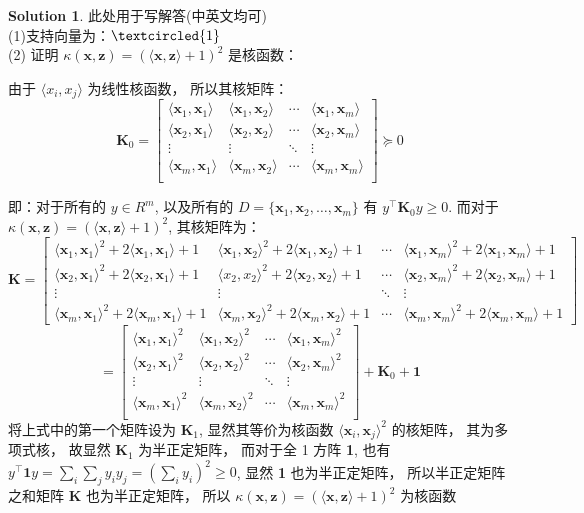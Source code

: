 \documentclass[a4paper,UTF8]{article}
\numberwithin{equation}{section}
\theoremstyle{definition}
\newtheorem*{solution}{Solution}
\def \K {\mathbf{K}}
\def \x {\boldsymbol{x}}
\def \z {\mathbf{z}}
\begin{document}
\begin{solution}
此处用于写解答(中英文均可)
~\\
(1)支持向量为：$\textcircled{1}$\\
(2) 
证明 $\kappa(\x, \z) = (\langle \x, \z \rangle + 1)^2$ 是核函数：

由于 $\langle x_i, x_j \rangle$ 为线性核函数， 所以其核矩阵：
$$\K_0 =
\begin{bmatrix}

\langle \x_1, \x_1 \rangle  & \langle \x_1, \x_2 \rangle & \cdots & \langle \x_1, \x_m \rangle \\
\langle \x_2, \x_1 \rangle & \langle \x_2, \x_2 \rangle & \cdots & \langle \x_2, \x_m \rangle \\
\vdots & \vdots & \ddots & \vdots \\
\langle \x_m, \x_1 \rangle & \langle \x_m, \x_2 \rangle & \cdots & \langle \x_m, \x_m \rangle \\
\end{bmatrix}
\succeq 0 $$


即：对于所有的 $y \in R^m$, 以及所有的 $ D = \{\x_1, \x_2, \ldots, \x_m\}$ 有 $y^\top \K_0 y \geq 0$. 而对于 $\kappa(\x, \z) =(\langle \x, \z \rangle + 1)^2$, 其核矩阵为：
$$\K =
\begin{bmatrix}
\langle \x_1, \x_1 \rangle^2 + 2\langle \x_1, \x_1 \rangle + 1 & \langle \x_1, \x_2 \rangle^2 + 2\langle \x_1, \x_2 \rangle + 1 & \cdots & \langle \x_1, \x_m \rangle^2 + 2\langle \x_1, \x_m \rangle + 1 \\
\langle \x_2, \x_1 \rangle^2 + 2\langle \x_2, \x_1 \rangle + 1 & \langle x_2, x_2 \rangle^2 + 2\langle \x_2, \x_2 \rangle + 1 & \cdots & \langle \x_2, \x_m \rangle^2 + 2\langle \x_2, \x_m \rangle + 1 \\
\vdots & \vdots & \ddots & \vdots \\
\langle \x_m, \x_1 \rangle^2 + 2\langle \x_m, \x_1 \rangle + 1 & \langle \x_m, \x_2 \rangle^2 + 2\langle \x_m, \x_2 \rangle + 1 & \cdots & \langle \x_m, \x_m \rangle^2 + 2\langle \x_m, \x_m \rangle + 1
\end{bmatrix}$$
$$= 
\begin{bmatrix}

\langle \x_1, \x_1 \rangle^2  & \langle \x_1, \x_2 \rangle^2 & \cdots & \langle \x_1, \x_m \rangle^2 \\
\langle \x_2, \x_1 \rangle^2 & \langle \x_2, \x_2 \rangle^2 & \cdots & \langle \x_2, \x_m \rangle^2 \\
\vdots & \vdots & \ddots & \vdots \\
\langle \x_m, \x_1 \rangle^2 & \langle \x_m, \x_2 \rangle^2 & \cdots & \langle \x_m, \x_m \rangle^2 \\
\end{bmatrix}
+\K_0 + \textbf{1}
$$
将上式中的第一个矩阵设为 $\K_1$, 显然其等价为核函数 $\langle \x_i, \x_j \rangle^2$ 的核矩阵， 其为多项式核， 故显然 $\K_1$ 为半正定矩阵， 而对于全 1 方阵 \textbf{1}, 也有 $y^\top \textbf{1} y = \sum_{i}\sum_{j} y_i y_j = (\sum_{i} y_i)^2 \geq 0$, 显然 \textbf{1} 也为半正定矩阵， 所以半正定矩阵之和矩阵 $\K$ 也为半正定矩阵， 所以 $\kappa(\x, \z) = (\langle \x, \z \rangle + 1)^2$ 为核函数


\end{solution}
\end{document}
